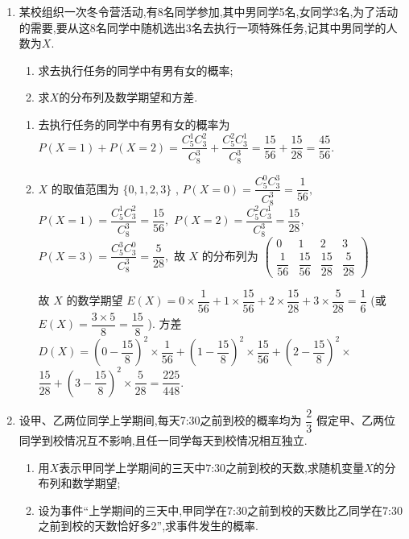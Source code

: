 \begin{enumerate}
\item 某校组织一次冬令营活动,有8名同学参加,其中男同学5名,女同学3名,为了活动的需要,要从这8名同学中随机选出3名去执行一项特殊任务,记其中男同学的人数为$X$. 
\begin{enumerate}
\item 求去执行任务的同学中有男有女的概率;
\item 求$X$的分布列及数学期望和方差.
\end{enumerate}
\begin{jieda}
    
    \begin{enumerate}
        \item 去执行任务的同学中有男有女的概率为
$P\left( {X = 1}\right)  + P\left( {X = 2}\right)  = \dfrac{{{C}}_{5}^{1}{{C}}_{3}^{2}}{{{C}}_{8}^{3}} + \dfrac{{{C}}_{5}^{2}{{C}}_{3}^{1}}{{{C}}_{8}^{3}} = \dfrac{15}{56} + \dfrac{15}{28} = \dfrac{45}{56}.$
    \item $X$ 的取值范围为 $\{ 0,1,2,3\}$ ,
$P\left( {X = 0}\right)  = \dfrac{{{C}}_{5}^{0}{{C}}_{3}^{3}}{{{C}}_{8}^{3}} = \dfrac{1}{56},$
$P\left( {X = 1}\right)  = \dfrac{{{C}}_{5}^{1}{{C}}_{3}^{2}}{{{C}}_{8}^{3}} = \dfrac{15}{56},$
$P\left( {X = 2}\right)  = \dfrac{{{C}}_{5}^{2}{{C}}_{3}^{1}}{{{C}}_{8}^{3}} = \dfrac{15}{28},$
$P\left( {X = 3}\right)  = \dfrac{{{C}}_{5}^{3}{{C}}_{3}^{0}}{{{C}}_{8}^{3}} = \dfrac{5}{28},$
故 $X$ 的分布列为
$\begin{pmatrix}
    0&  1&  2 &3\\
 \dfrac{1}{56} & \dfrac{15}{56} & \dfrac{15}{28} & \dfrac{5}{28}
\end{pmatrix}$

故 $X$ 的数学期望 $E\left( X\right)  = 0 \times  \dfrac{1}{56} + 1 \times  \dfrac{15}{56} + 2 \times  \dfrac{15}{28} + 3 \times  \dfrac{5}{28} = \dfrac{1}{6}$
(或 $E\left( X\right)  = \dfrac{3 \times  5}{8} = \dfrac{15}{8}$ ).
方差 $D\left( X\right)  = {\left( 0 - \dfrac{15}{8}\right) }^{2} \times  \dfrac{1}{56} + {\left( 1 - \dfrac{15}{8}\right) }^{2} \times  \dfrac{15}{56} + {\left( 2 - \dfrac{15}{8}\right) }^{2} \times$
$\dfrac{15}{28} + {\left( 3 - \dfrac{15}{8}\right) }^{2} \times  \dfrac{5}{28} = \dfrac{225}{448}.$
    \end{enumerate}
\end{jieda}

\item 设甲、乙两位同学上学期间,每天7:30之前到校的概率均为 $\dfrac{2}{3}$ 假定甲、乙两位同学到校情况互不影响,且任一同学每天到校情况相互独立.
\begin{enumerate}
\item 用$X$表示甲同学上学期间的三天中7:30之前到校的天数,求随机变量$X$的分布列和数学期望;
\item 设为事件“上学期间的三天中,甲同学在7:30之前到校的天数比乙同学在7:30之前到校的天数恰好多2”,求事件发生的概率.
\end{enumerate}


\end{enumerate}
